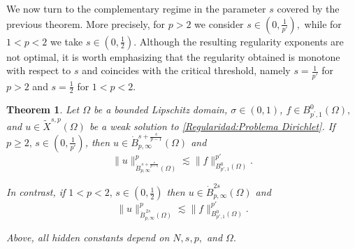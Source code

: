 \documentclass[]{amsart}
\newtheorem{theorem}{Theorem}[section]
\theoremstyle{definition}
\theoremstyle{definition}
\theoremstyle{remark}
\numberwithin{equation}{section}
\begin{document}
We now turn to the complementary regime in the parameter $s$ covered by the previous theorem. More precisely, for $p>2$ we consider  \(s \in \left(0,\tfrac{1}{p'}\right),\) while for $1<p<2$ we take \(s \in \left(0,\tfrac12\right).\) Although the resulting regularity exponents are not optimal, it is worth emphasizing that the regularity obtained is monotone with respect to $s$ and coincides with the critical threshold, namely $s=\tfrac{1}{p'}$ for $p>2$ and $s=\tfrac{1}{2}$ for $1<p<2$.

	\begin{theorem}
	\label{teo-reg-subopt}
	Let \(\Omega\) be a bounded Lipschitz domain, \( \sigma \in (0,1)\), \(f \in B_{p^{\prime},1}^{0}(\Omega),\)  and \(u \in \widetilde{X}^{s,p}(\Omega)\) be a weak solution to \eqref{Regularidad:Problema Dirichlet}. If \( p \geq 2, \, s \in (0,\frac{1}{p'})\),  then \(u \in \dot{B}_{p, \infty}^{s+\frac{s}{p-1}}(\Omega)\) and
		\[
		\|u\|_{\dot{B}_{p, \infty}^{\,s + \frac{s}{p-1}}(\Omega)}^p 
		\lesssim 
		\|f\|_{B^{0}_{p',1}(\Omega)}^{p'}.
		\] 
				
In contrast, if \( 1 < p < 2, \, s \in (0,\frac{1}{2})\) then  \(u \in \dot{B}_{p, \infty}^{2s}(\Omega)\) and
		\[
		\|u\|_{\dot{B}_{p, \infty}^{\,2s }(\Omega)}^p 
		\lesssim 
		\|f\|_{B^{0}_{p',1}(\Omega)}^{p'}.
		\]
		
		Above, all hidden constants depend on \( N,s,p, \) and \( \Omega. \)
	\end{theorem}
\end{document}
